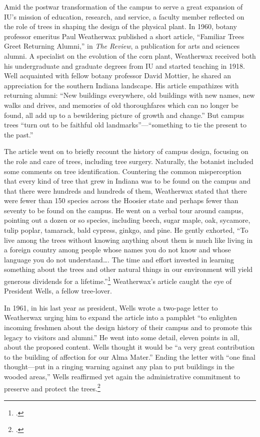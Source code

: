 \documentclass[
  american,
  letterpaper,
]{scrreprt}
\begin{document}
Amid the postwar transformation of the campus to serve a great expansion
of IU's mission of education, research, and service, a faculty member
reflected on the role of trees in shaping the design of the physical
plant. In 1960, botany professor emeritus Paul Weatherwax published a
short article, ``Familiar Trees Greet Returning Alumni,'' in \emph{The
Review}, a publication for arts and sciences alumni. A specialist on the
evolution of the corn plant, Weatherwax received both his undergraduate
and graduate degrees from IU and started teaching in 1918. Well
acquainted with fellow botany professor David Mottier, he shared an
appreciation for the southern Indiana landscape. His article empathizes
with returning alumni: ``New buildings everywhere, old buildings with
new names, new walks and drives, and memories of old thoroughfares which
can no longer be found, all add up to a bewildering picture of growth
and change.'' But campus trees ``turn out to be faithful old
landmarks''---``something to tie the present to the past.''

The article went on to briefly recount the history of campus design,
focusing on the role and care of trees, including tree surgery.
Naturally, the botanist included some comments on tree identification.
Countering the common misperception that every kind of tree that grew in
Indiana was to be found on the campus and that there were hundreds and
hundreds of them, Weatherwax stated that there were fewer than 150
species across the Hoosier state and perhaps fewer than seventy to be
found on the campus. He went on a verbal tour around campus, pointing
out a dozen or so species, including beech, sugar maple, oak, sycamore,
tulip poplar, tamarack, bald cypress, ginkgo, and pine. He gently
exhorted, ``To live among the trees without knowing anything about them
is much like living in a foreign country among people whose names you do
not know and whose language you do not understand\ldots. The time and
effort invested in learning something about the trees and other natural
things in our environment will yield generous dividends for a
lifetime.''\footnote{.} Weatherwax's article caught the eye of President
Wells, a fellow tree-lover.

In 1961, in his last year as president, Wells wrote a two-page letter to
Weatherwax urging him to expand the article into a pamphlet ``to
enlighten incoming freshmen about the design history of their campus and
to promote this legacy to visitors and alumni.'' He went into some
detail, eleven points in all, about the proposed content. Wells thought
it would be ``a very great contribution to the building of affection for
our Alma Mater.'' Ending the letter with ``one final thought---put in a
ringing warning against any plan to put buildings in the wooded areas,''
Wells reaffirmed yet again the administrative commitment to preserve and
protect the trees.\footnote{.}
\end{document}

